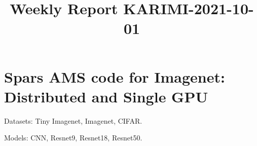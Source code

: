 \documentclass{article}
\newtheorem{definition}{Definition}
\newcommand{\algo}{\textsc{eff-EBM}}
\begin{document}
\title{Weekly Report KARIMI-2021-10-01}


\date{}
\maketitle

\vspace{-0.5in}



\section{Spars AMS code for Imagenet: Distributed and Single GPU}
Datasets: Tiny Imagenet, Imagenet, CIFAR.

Models: CNN, Resnet9, Resnet18, Resnet50.

%
%
%
%
\end{document}

